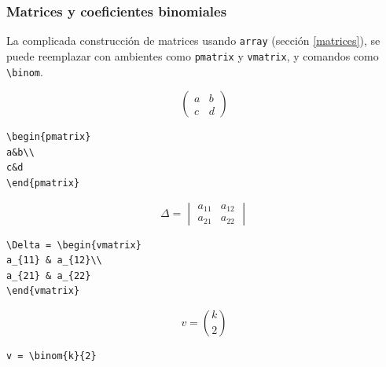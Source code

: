 {\subsubsection{Matrices y coeficientes binomiales}

La complicada construcci\'on de matrices usando \verb+array+ (secci\'on
\ref{matrices}), se puede reemplazar con ambientes como
\verb+pmatrix+ y \verb+vmatrix+, y comandos como \verb+\binom+.

\vspace{.3cm}
{\small
\begin{minipage}[t]{5cm}
$$\begin{pmatrix}
a&b\\
c&d
\end{pmatrix}
$$
\end{minipage}
\hspace{2cm}
\begin{minipage}[t]{5cm}
\begin{verbatim}
\begin{pmatrix}
a&b\\
c&d
\end{pmatrix}
\end{verbatim}
\end{minipage}

\vspace{.3cm}
\begin{minipage}[t]{5cm}
$$ 
\Delta = \begin{vmatrix}
a_{11} & a_{12}\\
a_{21} & a_{22}
\end{vmatrix}
$$
\end{minipage}
\hspace{2cm}
\begin{minipage}[t]{5cm}
\begin{verbatim}
\Delta = \begin{vmatrix}
a_{11} & a_{12}\\
a_{21} & a_{22}
\end{vmatrix}
\end{verbatim}
\end{minipage}

\vspace{.3cm}
\begin{minipage}[c]{5cm}
$$ v = \binom{k}{2}
 $$
\end{minipage}
\hspace{2cm}
\begin{minipage}[t]{5cm}
\begin{verbatim}
v = \binom{k}{2}
\end{verbatim}
\end{minipage}
}
\vspace{.3cm}

}
